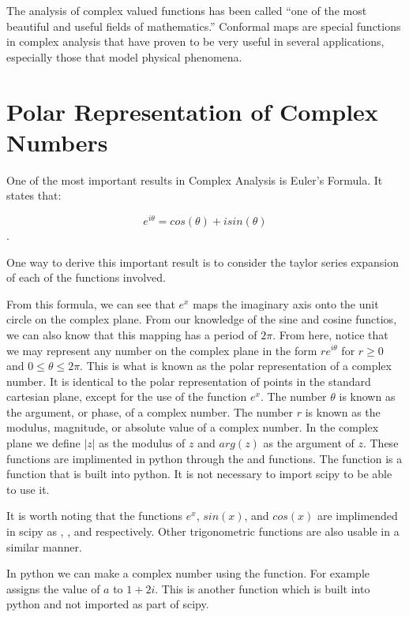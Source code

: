 

The analysis of complex valued functions has been called ``one of the most beautiful and useful fields of mathematics.''  Conformal maps are special functions in complex analysis that have proven to be very useful in several applications, especially those that model physical phenomena.

\section*{Polar Representation of Complex Numbers}

One of the most important results in Complex Analysis is Euler's Formula. It states that: 

$$e^{i\theta}=cos(\theta)+i sin(\theta)$$.

One way to derive this important result is to consider the taylor series expansion of each of the functions involved. 

From this formula, we can see that $e^x$ maps the imaginary axis onto the unit circle on the complex plane. From our knowledge of the sine and cosine functios, we can also know that this mapping has a period of $2\pi$. From here, notice that we may represent any number on the complex plane in the form $r e^{i\theta}$ for $r\geq 0$ and $0 \leq \theta \leq 2\pi$. This is what is known as the polar representation of a complex number. It is identical to the polar representation of points in the standard cartesian plane, except for the use of the function $e^x$. The number $\theta$ is known as the argument, or phase, of a complex number. The number $r$ is known as the modulus, magnitude, or absolute value of a complex number. In the complex plane we define $|z|$ as the modulus of $z$ and $arg(z)$ as the argument of $z$. These functions are implimented in python through the  and  functions. The function  is a function that is built into python. It is not necessary to import scipy to be able to use it.

It is worth noting that the functions $e^x$, $sin(x)$, and $cos(x)$ are implimended in scipy as , , and  respectively. Other trigonometric functions are also usable in a similar manner.

In python we can make a complex number using the  function. For example  assigns the value of $a$ to $1+2i$. This is another function which is built into python and not imported as part of scipy.

